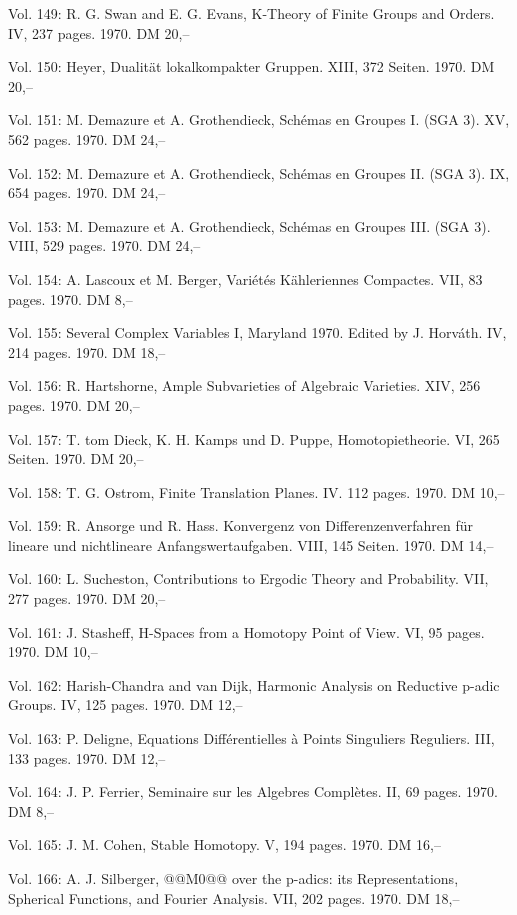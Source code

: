 Vol. 149: R. G. Swan and E. G. Evans, K-Theory of Finite Groups and Orders. IV, 237 pages. 1970. DM 20,--

Vol. 150: Heyer, Dualität lokalkompakter Gruppen. XIII, 372 Seiten. 1970. DM 20,--

Vol. 151: M. Demazure et A. Grothendieck, Schémas en Groupes I. (SGA 3). XV, 562 pages. 1970. DM 24,--

Vol. 152: M. Demazure et A. Grothendieck, Schémas en Groupes II. (SGA 3). IX, 654 pages. 1970. DM 24,--

Vol. 153: M. Demazure et A. Grothendieck, Schémas en Groupes III. (SGA 3). VIII, 529 pages. 1970. DM 24,--

Vol. 154: A. Lascoux et M. Berger, Variétés Kähleriennes Compactes. VII, 83 pages. 1970. DM 8,--

Vol. 155: Several Complex Variables I, Maryland 1970. Edited by J. Horváth. IV, 214 pages. 1970. DM 18,--

Vol. 156: R. Hartshorne, Ample Subvarieties of Algebraic Varieties. XIV, 256 pages. 1970. DM 20,--

Vol. 157: T. tom Dieck, K. H. Kamps und D. Puppe, Homotopietheorie. VI, 265 Seiten. 1970. DM 20,--

Vol. 158: T. G. Ostrom, Finite Translation Planes. IV. 112 pages. 1970. DM 10,--

Vol. 159: R. Ansorge und R. Hass. Konvergenz von Differenzenverfahren für lineare und nichtlineare Anfangswertaufgaben. VIII, 145 Seiten. 1970. DM 14,--

Vol. 160: L. Sucheston, Contributions to Ergodic Theory and Probability. VII, 277 pages. 1970. DM 20,--

Vol. 161: J. Stasheff, H-Spaces from a Homotopy Point of View. VI, 95 pages. 1970. DM 10,--

Vol. 162: Harish-Chandra and van Dijk, Harmonic Analysis on Reductive p-adic Groups. IV, 125 pages. 1970. DM 12,--

Vol. 163: P. Deligne, Equations Différentielles à Points Singuliers Reguliers. III, 133 pages. 1970. DM 12,--

Vol. 164: J. P. Ferrier, Seminaire sur les Algebres Complètes. II, 69 pages. 1970. DM 8,--

Vol. 165: J. M. Cohen, Stable Homotopy. V, 194 pages. 1970. DM 16,--

Vol. 166: A. J. Silberger, @@M0@@ over the p-adics: its Representations, Spherical Functions, and Fourier Analysis. VII, 202 pages. 1970. DM 18,--

